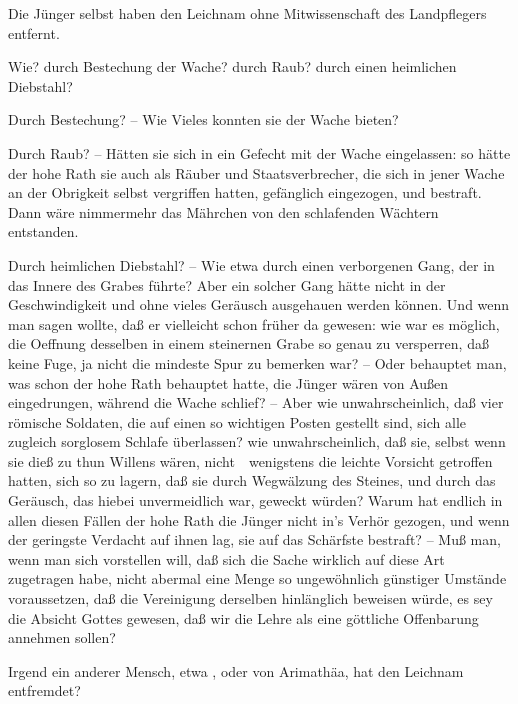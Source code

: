 \begin{aufza}
\begin{aufzb}
\begin{aufzc}
\end{aufzc}
\item Die Jünger selbst haben den Leichnam ohne Mitwissenschaft des Landpflegers entfernt.\par
Wie? durch Bestechung der Wache? durch Raub? durch einen heimlichen Diebstahl?
\begin{aufzc}
\item Durch Bestechung? -- Wie Vieles konnten sie der Wache bieten?
\item Durch Raub? -- Hätten sie sich in ein Gefecht mit der Wache eingelassen: so hätte der hohe Rath sie auch als Räuber und Staatsverbrecher, die sich in jener Wache an der Obrigkeit selbst vergriffen hatten, gefänglich eingezogen, und bestraft. Dann wäre nimmermehr das Mährchen von den schlafenden Wächtern entstanden.
\item Durch heimlichen Diebstahl? -- Wie etwa durch einen verborgenen Gang, der in das Innere des Grabes führte? Aber ein solcher Gang hätte nicht in der Geschwindigkeit und ohne vieles Geräusch ausgehauen werden können. Und wenn man sagen wollte, daß er vielleicht schon früher da gewesen: wie war es möglich, die Oeffnung desselben in einem steinernen Grabe so genau zu versperren, daß keine Fuge, ja nicht die mindeste Spur zu bemerken war? -- Oder behauptet man, was schon der hohe Rath behauptet hatte, die Jünger wären von Außen eingedrungen, während die Wache schlief? -- Aber wie unwahrscheinlich, daß vier römische Soldaten, die auf einen so wichtigen Posten gestellt sind, sich alle zugleich sorglosem Schlafe überlassen? wie unwahrscheinlich, daß sie, selbst wenn sie dieß zu thun Willens wären, nicht~\ wenigstens die leichte Vorsicht getroffen hatten, sich so zu lagern, daß sie durch Wegwälzung des Steines, und durch das Geräusch, das hiebei unvermeidlich war, geweckt würden? Warum hat endlich in allen diesen Fällen der hohe Rath die Jünger nicht in's Verhör gezogen, und wenn der geringste Verdacht auf ihnen lag, sie auf das Schärfste bestraft? -- Muß man, wenn man sich vorstellen will, daß sich die Sache wirklich auf diese Art zugetragen habe, nicht abermal eine Menge so ungewöhnlich günstiger Umstände voraussetzen, daß die Vereinigung derselben hinlänglich beweisen würde, es sey die Absicht Gottes gewesen, daß wir die Lehre  als eine göttliche Offenbarung annehmen sollen?
\end{aufzc}
\item Irgend ein anderer Mensch, etwa , oder  von Arimathäa, hat den Leichnam entfremdet?\par

\end{aufzb}
\end{aufza}
